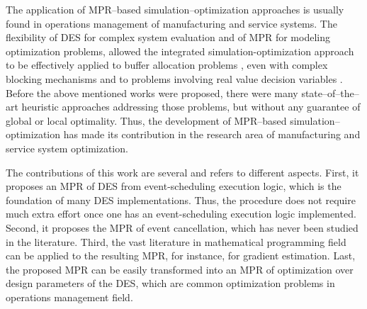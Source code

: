 \documentclass[]{interact}
\theoremstyle{plain}%
\theoremstyle{definition}
\theoremstyle{remark}
\begin{document}
The application of MPR--based simulation--optimization approaches is usually found in operations management of manufacturing and service systems. %
The flexibility of DES for complex system evaluation and of MPR for modeling optimization problems, allowed the integrated simulation-optimization approach to be effectively applied to buffer allocation problems \citep{zhang2020BAP}, even with complex blocking mechanisms \citep{pedrielli2015integrated} and to problems involving real value decision variables \citep{tan2015mathematical,zhang2020models}. 
Before the above mentioned works were proposed, there were many state--of--the--art heuristic approaches addressing those problems, but without any guarantee of global or local optimality. Thus, the development of MPR--based simulation--optimization has made its contribution in the research area of manufacturing and service system optimization.


The contributions of this work are several and refers to different aspects. First, it proposes an MPR of DES from event-scheduling execution logic, which is the foundation of many DES implementations. Thus, the procedure does not require much extra effort once one has an event-scheduling execution logic implemented. Second, it proposes the MPR of event cancellation, which has never been studied in the literature. Third, the vast literature in mathematical programming field can be applied to the resulting MPR, for instance, for gradient estimation. Last, the proposed MPR can be easily transformed into an MPR of optimization over design parameters of the DES, which are common optimization problems in operations management field.  
\end{document}
